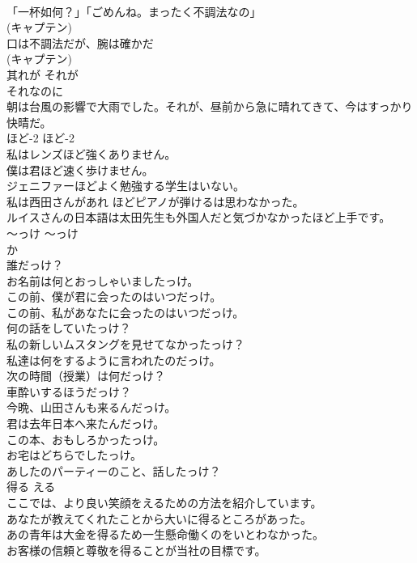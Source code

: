 \documentclass[8pt]{extreport}
\begin{document}
\begin{CJK}{UTF8}{min}
\\	「一杯如何？」「ごめんね。まったく不調法なの」   
\\	(キャプテン)
\\	口は不調法だが、腕は確かだ  
\\	(キャプテン)
\\	其れが	それが	
\\	それなのに	
\\	朝は台風の影響で大雨でした。それが、昼前から急に晴れてきて、今はすっかり快晴だ。  
\\	ほど-2	ほど-2	
\\	私はレンズほど強くありません。	
\\	僕は君ほど速く歩けません。   
\\	ジェニファーほどよく勉強する学生はいない。   
\\	私は西田さんがあれ ほどピアノが弾けるは思わなかった。  
\\	ルイスさんの日本語は太田先生も外国人だと気づかなかったほど上手です。   
\\	〜っけ	〜っけ	
\\	か	
\\	誰だっけ？  
\\	お名前は何とおっしゃいましたっけ。  
\\	この前、僕が君に会ったのはいつだっけ。  
\\	この前、私があなたに会ったのはいつだっけ。  
\\	何の話をしていたっけ？  
\\	私の新しいムスタングを見せてなかったっけ？  
\\	私達は何をするように言われたのだっけ。  
\\	次の時間（授業）は何だっけ？  
\\	車酔いするほうだっけ？  
\\	今晩、山田さんも来るんだっけ。   
\\	君は去年日本へ来たんだっけ。   
\\	この本、おもしろかったっけ。   
\\	お宅はどちらでしたっけ。  
\\	あしたのパーティーのこと、話したっけ？  
\\	得る	える	
\\	ここでは、より良い笑顔をえるための方法を紹介しています。  
\\	あなたが教えてくれたことから大いに得るところがあった。  
\\	あの青年は大金を得るため一生懸命働くのをいとわなかった。  
\\	お客様の信頼と尊敬を得ることが当社の目標です。  

\end{CJK}
\end{document}
